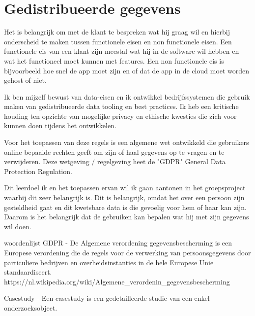 \section{Gedistribueerde gegevens}\label{sec:gedistribueerde-gegevens}

Het is belangrijk om met de klant te bespreken wat hij graag wil en hierbij onderscheid te maken tussen functionele
eisen en non functionele eisen.
Een functionele eis van een klant zijn meestal wat hij in de software wil hebben en wat het functioneel moet kunnen met features.
Een non functionele eis is bijvoorbeeld hoe snel de app moet zijn en of dat de app in de cloud moet worden gehost of
niet.

Ik ben mijzelf bewust van data-eisen en ik ontwikkel bedrijfssystemen die gebruik maken van gedistribueerde
data tooling en best practices.
Ik heb een kritische houding ten opzichte van mogelijke privacy en ethische kwesties die zich voor kunnen doen
tijdens het ontwikkelen.

Voor het toepassen van deze regels is een algemene wet ontwikkeld die gebruikers online bepaalde rechten geeft om zijn of haal gegevens op te vragen en te verwijderen.
Deze wetgeving / regelgeving heet de "GDPR" General Data Protection Regulation.

Dit leerdoel ik en het toepassen ervan wil ik gaan aantonen in het groepsproject waarbij dit zeer belangrijk is.
Dit is belangrijk, omdat het over een persoon zijn gesteldheid gaat en dit kwetsbare data is die gevoelig voor hem of haar kan zijn.
Daarom is het belangrijk dat de gebruiken kan bepalen wat hij met zijn gegevens wil doen.


\newpage
\bigskip
\bigskip
woordenlijst
GDPR - De Algemene verordening gegevensbescherming is een Europese verordening die de regels voor de verwerking van
persoonsgegevens door particuliere bedrijven en overheidsinstanties in de hele Europese Unie standaardiseert.
https://nl.wikipedia.org/wiki/Algemene\_verordenin\_gegevensbescherming

Casestudy -  Een casestudy is een gedetailleerde studie van een enkel onderzoeksobject.

